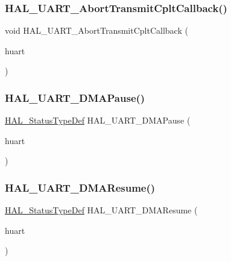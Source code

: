 \subsubsection{\texorpdfstring{H\+A\+L\+\_\+\+U\+A\+R\+T\+\_\+\+Abort\+Transmit\+Cplt\+Callback()}{HAL\_UART\_AbortTransmitCpltCallback()}}
{\footnotesize\ttfamily void H\+A\+L\+\_\+\+U\+A\+R\+T\+\_\+\+Abort\+Transmit\+Cplt\+Callback (\begin{DoxyParamCaption}\item[{\hyperlink{group___u_a_r_t___exported___types_ga7adf4f3e4c3ecde572be5925c915a967}{U\+A\+R\+T\+\_\+\+Handle\+Type\+Def} $\ast$}]{huart }\end{DoxyParamCaption})}

\mbox{\label{group___u_a_r_t___exported___functions___group2_ga8a713fd976d8ef02b818ea6ff0d4e41a}} 
\subsubsection{\texorpdfstring{H\+A\+L\+\_\+\+U\+A\+R\+T\+\_\+\+D\+M\+A\+Pause()}{HAL\_UART\_DMAPause()}}
{\footnotesize\ttfamily \hyperlink{stm32f4xx__hal__def_8h_a63c0679d1cb8b8c684fbb0632743478f}{H\+A\+L\+\_\+\+Status\+Type\+Def} H\+A\+L\+\_\+\+U\+A\+R\+T\+\_\+\+D\+M\+A\+Pause (\begin{DoxyParamCaption}\item[{\hyperlink{group___u_a_r_t___exported___types_ga7adf4f3e4c3ecde572be5925c915a967}{U\+A\+R\+T\+\_\+\+Handle\+Type\+Def} $\ast$}]{huart }\end{DoxyParamCaption})}

\mbox{\label{group___u_a_r_t___exported___functions___group2_gaf2b3e6004d0200857781809baa16072d}} 
\subsubsection{\texorpdfstring{H\+A\+L\+\_\+\+U\+A\+R\+T\+\_\+\+D\+M\+A\+Resume()}{HAL\_UART\_DMAResume()}}
{\footnotesize\ttfamily \hyperlink{stm32f4xx__hal__def_8h_a63c0679d1cb8b8c684fbb0632743478f}{H\+A\+L\+\_\+\+Status\+Type\+Def} H\+A\+L\+\_\+\+U\+A\+R\+T\+\_\+\+D\+M\+A\+Resume (\begin{DoxyParamCaption}\item[{\hyperlink{group___u_a_r_t___exported___types_ga7adf4f3e4c3ecde572be5925c915a967}{U\+A\+R\+T\+\_\+\+Handle\+Type\+Def} $\ast$}]{huart }\end{DoxyParamCaption})}

